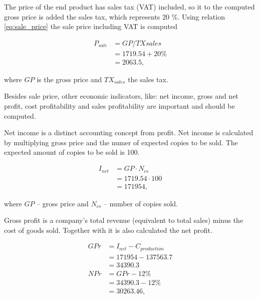 The price of the end product has sales tax (VAT) included, so it to the computed gross price is added the sales tax, which represents 20 \%. Using relation \ref{eq:sale_price} the sale price including VAT is computed

\begin{equation}\label{eq:sale_price}
 \begin{split}
  P_{sale} &= GP / TX{sales}\\
           &= 1719.54 + 20 \% \\
           &= 2063.5,
 \end{split}
\end{equation}

\noindent
where $GP$ is the gross price and $TX_{sales}$ the sales tax. 

Besides sale price, other economic indicators, like: net income, gross and net profit, cost profitability and sales profitability are important and should be computed. 

Net income is a distinct accounting concept from profit. Net income is calculated by multiplying gross price and the numer of expected copies to be sold. The expected amount of copies to be sold is 100.

\begin{equation}
 \begin{split}
  I_{net} &= GP \cdot N_{cs}\\
          &= 1719.54  \cdot 100 \\
          &= 171954,
 \end{split}
\end{equation}

\noindent
where $GP$ -- gross price and $N_{cs}$ -- number of copies sold.

Gross profit is a company's total revenue (equivalent to total sales) minus the cost of goods sold. Together with it is also calculated the net profit. 

\begin{equation}
 \begin{split}
  GPr &= I_{net} - C_{production}\\
      &= 171954 - 137563.7\\
      &= 34390.3 \\
  NPr &= GPr - 12\% \\
      &= 34390.3 - 12\% \\
      &= 30263.46,
 \end{split}
\end{equation}

